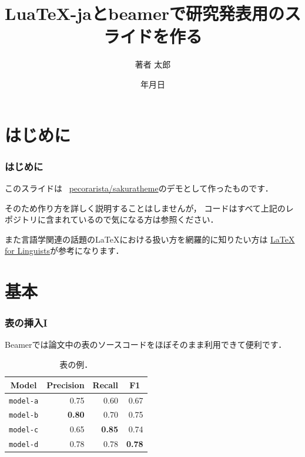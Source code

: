 \documentclass[%
    hyperref={%
        colorlinks,
        linkcolor=sDarkBlue,
        urlcolor=sDarkBlue,
        citecolor=sDarkBlue
    },
    aspectratio=169
]{beamer}
\title{Lua\TeX{}-jaとbeamerで研究発表用のスライドを作る}
\institute{所属}
\author{著者 太郎}
\date{{\number\year}年{\number\month}月{\number\day}日}
\newcommand\header[1]{\multicolumn{1}{c}{\textbf{#1}}}
\begin{document}
    \maketitle

    \section{はじめに}
    \begin{frame}
        \frametitle{はじめに}
        このスライドは \faGithub\ \href{https://github.com/pecorarista/sakuratheme}{\ttfamily pecorarista/sakuratheme}のデモとして作ったものです．

        \bigskip

        そのため作り方を詳しく説明することはしませんが，
        コードはすべて上記のレポジトリに含まれているので気になる方は参照ください．
        \bigskip

        また言語学関連の話題の\LaTeX における扱い方を網羅的に知りたい方は
        \href{https://www1.essex.ac.uk/linguistics/external/clmt/latex4ling/}
        {LaTeX for Linguists}が参考になります．
    \end{frame}

    \section{基本}
    \begin{frame}
        \frametitle{表の挿入I}
        Beamerでは論文中の表のソースコードをほぼそのまま利用できて便利です．
        \begin{table}
            \centering
            \caption{表の例．}
            \begin{tabular}{lrrr}
                \toprule
                \header{Model}   & \header{Precision} & \header{Recall} & \header{F1} \\
                \midrule
                \texttt{model-a} & 0.75 & 0.60 & 0.67 \\
                \texttt{model-b} & \textbf{0.80} & 0.70 & 0.75 \\
                \texttt{model-c} & 0.65 & \textbf{0.85} & 0.74 \\
                \texttt{model-d} & 0.78 & 0.78 & \textbf{0.78} \\
                \bottomrule
            \end{tabular}
        \end{table}
    \end{frame}
\end{document}

